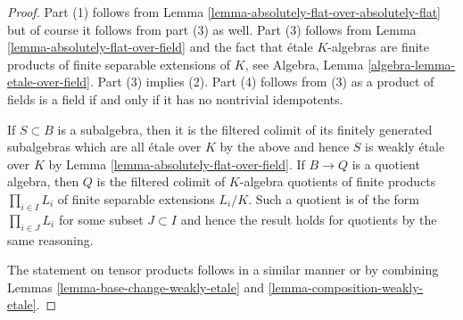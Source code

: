 \documentclass[10pt,a4paper]{amsart}
\theoremstyle{plain}
\theoremstyle{definition}
\theoremstyle{remark}
\numberwithin{equation}{subsection}
\begin{document}
\begin{proof}
Part (1) follows from Lemma \ref{lemma-absolutely-flat-over-absolutely-flat}
but of course it follows from part (3) as well.
Part (3) follows from Lemma \ref{lemma-absolutely-flat-over-field}
and the fact that \'etale $K$-algebras are finite products of
finite separable extensions of $K$, see
Algebra, Lemma \ref{algebra-lemma-etale-over-field}.
Part (3) implies (2).
Part (4) follows from (3) as a product of fields is
a field if and only if it has no nontrivial idempotents.

\medskip\noindent
If $S \subset B$ is a subalgebra, then it is the filtered
colimit of its finitely generated subalgebras which are
all \'etale over $K$ by the above and hence
$S$ is weakly \'etale over $K$ by
Lemma \ref{lemma-absolutely-flat-over-field}.
If $B \to Q$ is a quotient algebra, then
$Q$ is the filtered colimit of $K$-algebra quotients of
finite products $\prod_{i \in I} L_i$ of finite separable extensions
$L_i/K$. Such a quotient is of the form $\prod_{i \in J} L_i$
for some subset $J \subset I$ and hence the result
holds for quotients by the same reasoning.

\medskip\noindent
The statement on tensor products follows in a similar manner
or by combining Lemmas \ref{lemma-base-change-weakly-etale} and
\ref{lemma-composition-weakly-etale}.
\end{proof}
\end{document}
